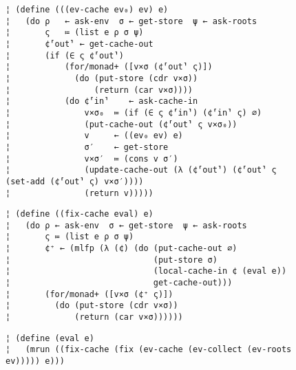 \begin{figure} %
\figskip{}
\begin{lstlisting}
¦ (define (((ev-cache ev₀) ev) e)
¦   (do ρ   ← ask-env  σ ← get-store  ψ ← ask-roots
¦       ς   ≔ (list e ρ σ ψ)
¦       ¢⸢out⸣ ← get-cache-out
¦       (if (∈ ς ¢⸢out⸣)
¦           (for/monad+ ([v×σ (¢⸢out⸣ ς)])
¦             (do (put-store (cdr v×σ))
¦                 (return (car v×σ))))
¦           (do ¢⸢in⸣    ← ask-cache-in
¦               v×σ₀  ≔ (if (∈ ς ¢⸢in⸣) (¢⸢in⸣ ς) ∅)
¦               (put-cache-out (¢⸢out⸣ ς v×σ₀))
¦               v     ← ((ev₀ ev) e)
¦               σ′    ← get-store
¦               v×σ′  ≔ (cons v σ′)
¦               (update-cache-out (λ (¢⸢out⸣) (¢⸢out⸣ ς (set-add (¢⸢out⸣ ς) v×σ′))))
¦               (return v)))))
\end{lstlisting}
\figskip{}
\begin{lstlisting}
¦ (define ((fix-cache eval) e)  
¦   (do ρ ← ask-env  σ ← get-store  ψ ← ask-roots
¦       ς ≔ (list e ρ σ ψ)
¦       ¢⁺ ← (mlfp (λ (¢) (do (put-cache-out ∅)
¦                             (put-store σ)
¦                             (local-cache-in ¢ (eval e))
¦                             get-cache-out)))
¦       (for/monad+ ([v×σ (¢⁺ ς)])
¦         (do (put-store (cdr v×σ))
¦             (return (car v×σ))))))
\end{lstlisting}
\figskip{}
\begin{lstlisting}
¦ (define (eval e)
¦   (mrun ((fix-cache (fix (ev-cache (ev-collect (ev-roots ev))))) e)))
\end{lstlisting}
\label{f:gc-components}
\end{figure} %

